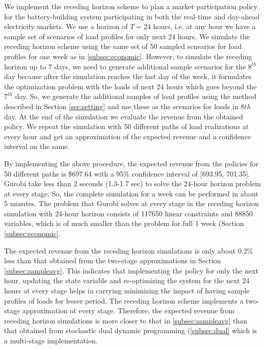 \documentclass[11pt,twoside]{article}
\begin{document}
We implement the receding horizon scheme to plan a market participation policy for the battery-building system participating in both the real-time and day-ahead electricity markets. We use a horizon of $T=24$ hours, i.e. at any hour we have a sample set of scenarios of load profiles for only next 24 hours. We simulate the receding horizon scheme using the same set of 50 sampled scnearios for load profiles for one week as in \ref{subsec:economic}. However, to simulate the receding horizon up to 7 days, we need to generate additional sample scenarios for the $8^{th}$ day because after the simulation reaches the last day of the week, it formulates the optimization problem with the loads of next 24 hours which goes beyond the $7^{th}$ day. So, we generate the additional samples of load profiles using the method described in Section \ref{sec:setting} and use these as the scenarios for loads in $8{th}$ day. At the end of the simulation we evaluate the revenue from the obtained policy. We repeat the simulation with 50 different paths of load realizations at every hour and get an approximation of the expected revenue and a confidence interval on the same.

By implementing the above procedure, the expected revenue from the policies for 50 different paths is \$697.64 with a 95\% confidence interval of [693.95, 701.35]. 
Gurobi take less than 2 seconds (1.3-1.7 sec) to solve the 24-hour horizon problem at every stage. So, the complete simulation for a week can be performed in about 5 minutes. The problem that Gurobi solves at every stage in the receding horizon simulation with 24-hour horizon consists of 117650 linear constraints and 88850 variables, which is of much smaller than the problem for full 1 week (Section \ref{subsec:economic}.

The expected revenue from the receding horizon simulations is only about 0.2\% less than that obtained from the two-stage approximations in Section \ref{subsec:sampleavg}. This indicates that implementing the policy for only the next hour, updating the state variable and re-optimizing the system for the next 24 hours at every stage helps in carrying minimizing the impact of having sample profiles of loads for lesser period. The receding horizon scheme implements a two-stage approximation at every stage. Therefore, the expected revenue from receding horizon simulations is more closer to that in \ref{subsec:sampleavg} than that obtained from stochastic dual dynamic programming (\ref{subsec:dual} which is a multi-stage implementation.
\end{document}
